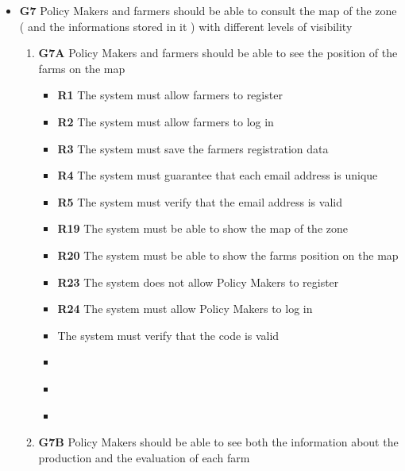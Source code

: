 \begin{itemize}
\item \textbf{G7} Policy Makers and farmers should be able to consult the map of the zone ( and the informations stored in it ) with different levels of visibility\\
    \begin{enumerate}
        \item \textbf{G7A} Policy Makers and farmers should be able to see the position of the farms on the map
        \begin{itemize}
            \renewcommand\labelitemi{--}
            \item\textbf{R1} The system must allow farmers to register\\
            \item\textbf{R2} The system must allow farmers to log in\\
            \item\textbf{R3} The system must save the farmers registration data\\
            \item\textbf{R4} The system must guarantee that each email address is unique\\
            \item\textbf{R5} The system must verify that the email address is valid\\
            \item\textbf{R19} The system must be able to show the map of the zone\\
            \item\textbf{R20} The system must be able to show the farms position on the map\\
            \item\textbf{R23} The system does not allow Policy Makers to register\\
            \item\textbf{R24} The system must allow Policy Makers to log in\\
            \item\textbf{} The system must verify that the code is valid\\
            \item\textbf{}
            \item\textbf{}
            \item\textbf{}
        \end{itemize}
        \item\textbf{G7B} Policy Makers should be able to see both the information about the production and the evaluation of each farm

\end{enumerate}
\end{itemize}
